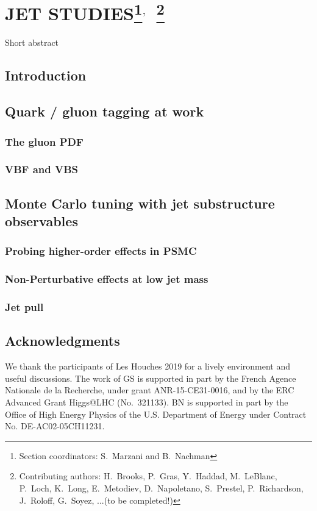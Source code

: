 \documentclass[11pt]{cernrep}
\begin{document}
\section{JET STUDIES\protect\footnote{Section coordinators: S.~Marzani and B.~Nachman}$^{,}$~\protect\footnote{Contributing authors: H.~Brooks, P.~Gras, Y.~Haddad, M.~LeBlanc, P.~Loch, K.~Long, E.~Metodiev, D.~Napoletano, S.~Prestel, P.~Richardson, J.~Roloff, G.~Soyez, ...(to be completed!)}}

Short abstract

\subsection{Introduction}

\subsection{Quark / gluon tagging at work}

\subsubsection{The gluon PDF}

\subsubsection{VBF and VBS}

\subsection{Monte Carlo tuning with jet substructure observables}

\subsubsection{Probing higher-order effects in PSMC}

\subsubsection{Non-Perturbative effects at low jet mass}

\subsubsection{Jet pull}

\subsection*{Acknowledgments}

We thank the participants of Les Houches 2019 for a lively environment and useful discussions.
%
The work of GS is supported in part by the French Agence Nationale de la Recherche,
under grant ANR-15-CE31-0016, and by the ERC Advanced Grant Higgs@LHC
(No.\ 321133).
%
BN is supported in part by the Office of High Energy Physics of the U.S. Department of Energy under Contract No. DE-AC02-05CH11231.
%


\end{document}
